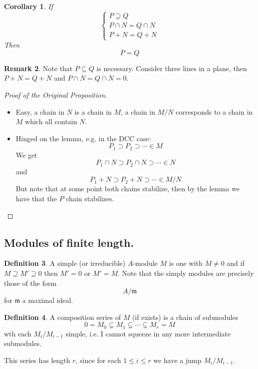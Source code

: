 \documentclass[11pt,a4paper]{article}
\theoremstyle{definition}
\newtheorem{definition}{Definition}[section]
\newtheorem{remark}[definition]{Remark}
\theoremstyle{plain}
\newtheorem{corollary}[definition]{Corollary}
\theoremstyle{remark}
\begin{document}
\begin{corollary}
    If 
    $$\begin{cases}
        P \supseteq Q \\
        P \cap N = Q \cap N \\
        P + N = Q + N 
    \end{cases}$$
    Then 
    $$P = Q$$
\end{corollary}

\begin{remark}
    Note that $P \subseteq Q$ is necessary. Consider three lines in a plane, then $P +N = Q + N$ and $P \cap N = Q \cap N = 0$.
\end{remark}


\begin{proof}[Proof of the Original Proposition]
    \begin{itemize}
        \item[$\implies$] Easy, a chain in $N$ is a chain in $M$, a chain in $M/N$ corresponds to a chain in $M$ which all contain $N$.
        \item[$\impliedby$] Hinged on the lemma, e.g. in the DCC case: 
        $$P_1 \supset P_2 \supset \cdots \in M$$
        We get 
        $$P_1 \cap N \supset P_2 \cap N \supset \cdots \in N$$
        and 
        $$P_1 + N \supset P_2 + N \supset \cdots \in M/N$$
        But note that at some point both chains stabilize, then by the lemma we have that the $P$ chain stabilizes.
    \end{itemize}
\end{proof}

\subsection{Modules of finite length.} 
\begin{definition}
    A simple (or irreducible) $A$-module $M$ is one with $M \ne 0$ and if $M \supseteq M' \supseteq 0$ then $M' = 0$ or $M' = M$.
    Note that the simply modules are precisely those of the form 
    $$A / \mathfrak{m}$$ 
    for $\mathfrak{m}$ a maximal ideal.
\end{definition}

\begin{definition}
    A composition series of $M$ (if exists) is a chain of submodules 
    $$0 = M_0 \subsetneq M_1 \subsetneq \cdots \subsetneq M_r = M$$
    wth each $M_i / M_{i-1}$ simple, i.e. I cannot squeeze in any more intermediate submodules.

    This series has length $r$, since for each $1 \le i \le r$ we have a jump $M_i/M_{i-1}$. 
\end{definition}
\end{document}
